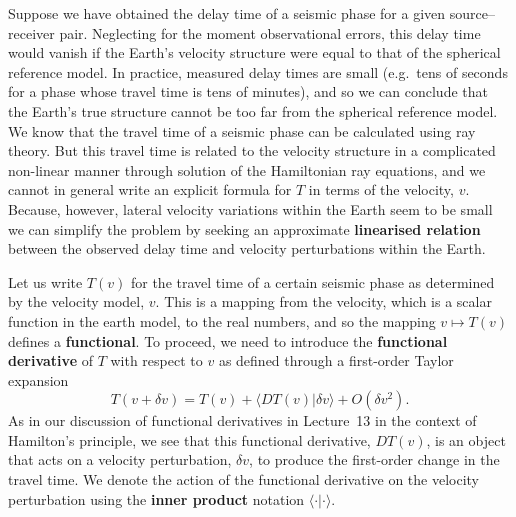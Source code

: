 Suppose we have obtained the delay time of a seismic phase for a given source--receiver pair. Neglecting for the moment 
observational errors, this delay time would vanish if the Earth's velocity structure were equal to that of the spherical 
reference model. In practice, measured delay times are small (e.g.\ tens of seconds for a phase whose travel time is tens 
of minutes), and so we can conclude that the Earth's true structure cannot be too far from the spherical reference model. 
We know that the travel time of a seismic phase can be calculated using ray theory. But this travel time is related to 
the velocity structure in a complicated non-linear manner through solution of the Hamiltonian ray equations, and we 
cannot in general write an explicit formula for $T$ in terms of the velocity, $v$. Because, however, lateral velocity 
variations within the Earth seem to be small we can simplify the problem by seeking an approximate \textbf{linearised relation}
between the observed delay time and velocity perturbations within the Earth. 

Let us write $T(v)$ for the travel time of a certain seismic phase as determined by the velocity model, $v$. This 
is a mapping from the velocity, which is a scalar function in the earth model, to the real numbers, and so the 
mapping $v\mapsto T(v)$ defines a
\textbf{functional}. To proceed, we need to introduce the 
\textbf{functional derivative} of  $T$ with respect to $v$ as defined through a first-order Taylor expansion
\begin{equation}
    T(v+\delta v) = T(v) + \langle DT(v)|\delta v \rangle + O(\delta v^{2}).
    \label{eq:2}
\end{equation}
As in our discussion of functional derivatives in Lecture~13 in the context of Hamilton's principle, we see that this 
functional derivative, $DT(v)$, is an object that acts on a velocity perturbation, $\delta v$, to produce the first-order 
change in the travel time. We denote the action of the functional derivative on the velocity perturbation using the \textbf{inner 
product} notation $\langle \cdot | \cdot \rangle$. 

